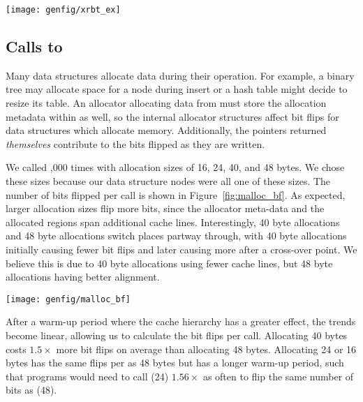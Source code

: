 \begin{SCfigure}
	\centering
	\texttt{[image: genfig/xrbt\_ex]}
	\caption[Typical behavior vs. \texttt{iteration\_count}]{A typical result of running a test program with increasing
		values of \texttt{iteration\_count}.}
	\label{fig:xrbt_ex}
\end{SCfigure}


\subsection{Calls to \malloc}
\label{sec:exp_malloc}

Many data structures allocate data during their operation. For example, a binary
tree may allocate space for a node during insert or a hash table might decide
to resize its table. An allocator allocating data from \NVM must store the
allocation metadata within \NVM as well, so the internal allocator structures
affect bit flips for data structures which allocate memory. Additionally, the
pointers returned \textit{themselves} contribute to the bits flipped as they are
written.

We called ,000 times with allocation sizes of 16, 24, 40, and 48
bytes. We chose these sizes because our data structure nodes were all
one of these sizes. The number of bits flipped per \malloc call is shown
in Figure~\ref{fig:malloc_bf}. As expected, larger allocation sizes flip more
bits, since the allocator meta-data and the allocated regions span additional
cache lines. Interestingly, 40 byte allocations and 48 byte allocations switch
places partway through, with 40 byte allocations initially causing fewer bit
flips and later causing more after a cross-over point. We believe this is due
to 40 byte allocations using fewer cache lines, but 48 byte allocations having
better alignment.

\begin{SCfigure}
	\centering
	\texttt{[image: genfig/malloc\_bf]}
	\caption[Bit flips from \malloc]{Bit flips due to calls to \malloc. Allocation size of 16 bytes is not
		shown because it matches with 24 bytes.}
	\label{fig:malloc_bf}
\end{SCfigure}


After a warm-up period where the cache hierarchy has a greater effect, the
trends become linear, allowing us to calculate the bit flips per \malloc call.
Allocating 40 bytes costs $1.5\times$ more bit flips on average than allocating
48 bytes. Allocating 24 or 16 bytes has the same flips per \malloc as 48 bytes
but has a longer warm-up period, such that programs would need to call \malloc(24)
$1.56\times$ as often to flip the same number of bits as \malloc(48).

